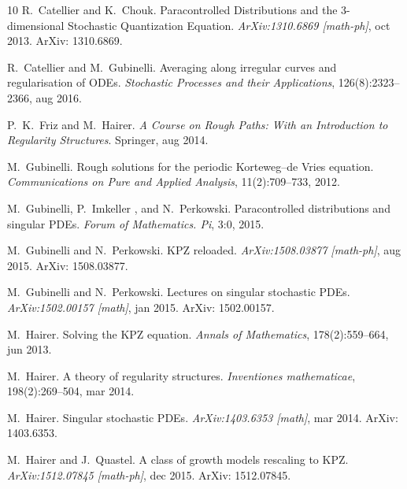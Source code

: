 \documentclass{amsart}
\newcommand{\tmtextit}[1]{{\itshape{#1}}}
\theoremstyle{remark}
\theoremstyle{definition}
\begin{document}
\begin{thebibliography}{10}
  R.~Catellier  and 
  K.~Chouk.{\newblock} Paracontrolled Distributions and the 3-dimensional
  Stochastic Quantization Equation.{\newblock} \tmtextit{ArXiv:1310.6869
  [math-ph]}, oct 2013.{\newblock} ArXiv: 1310.6869.{\newblock}
  
  R.~Catellier  and 
  M.~Gubinelli.{\newblock} Averaging along irregular curves and regularisation
  of ODEs.{\newblock} \tmtextit{Stochastic Processes and their Applications},
  126(8):2323--2366, aug 2016.{\newblock}
  
  P.~K.~Friz  and  M.~Hairer.{\newblock}
  \tmtextit{A Course on Rough Paths: With an Introduction to Regularity
  Structures}.{\newblock} Springer, aug 2014.{\newblock}
  
  M.~Gubinelli.{\newblock} Rough solutions
  for the periodic Korteweg--de Vries equation.{\newblock}
  \tmtextit{Communications on Pure and Applied Analysis}, 11(2):709--733,
  2012.{\newblock}
  
  M.~Gubinelli, P.~Imkeller , and 
  N.~Perkowski.{\newblock} Paracontrolled distributions and singular
  PDEs.{\newblock} \tmtextit{Forum of Mathematics. Pi}, 3:0, 2015.{\newblock}
  
  M.~Gubinelli  and  N.~Perkowski.{\newblock}
  KPZ reloaded.{\newblock} \tmtextit{ArXiv:1508.03877 [math-ph]}, aug
  2015.{\newblock} ArXiv: 1508.03877.{\newblock}
  
  M.~Gubinelli  and 
  N.~Perkowski.{\newblock} Lectures on singular stochastic PDEs.{\newblock}
  \tmtextit{ArXiv:1502.00157 [math]}, jan 2015.{\newblock} ArXiv:
  1502.00157.{\newblock}
  
  M.~Hairer.{\newblock} Solving the KPZ
  equation.{\newblock} \tmtextit{Annals of Mathematics}, 178(2):559--664, jun
  2013.{\newblock}
  
  M.~Hairer.{\newblock} A theory of regularity
  structures.{\newblock} \tmtextit{Inventiones mathematicae}, 198(2):269--504,
  mar 2014.{\newblock}
  
  M.~Hairer.{\newblock} Singular stochastic
  PDEs.{\newblock} \tmtextit{ArXiv:1403.6353 [math]}, mar 2014.{\newblock}
  ArXiv: 1403.6353.{\newblock}
  
  M.~Hairer  and  J.~Quastel.{\newblock} A
  class of growth models rescaling to KPZ.{\newblock}
  \tmtextit{ArXiv:1512.07845 [math-ph]}, dec 2015.{\newblock} ArXiv:
  1512.07845.{\newblock}
  

\end{thebibliography}
\end{document}
